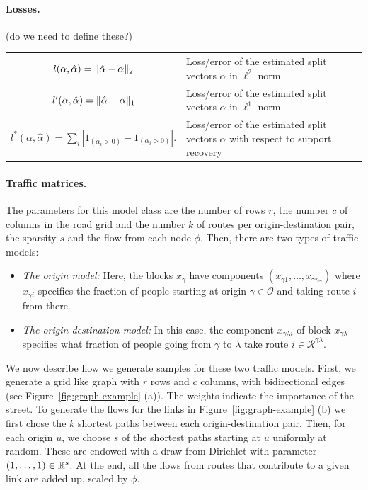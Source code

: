 \documentclass{article} %
\newcommand{\OO}{\mathcal{O}}
\newcommand{\RR}{\mathcal{R}}
\begin{document}
\paragraph{Losses.} (do we need to define these?)
\begin{tabular}{cl}
$l(\alpha, \hat\alpha) = \lVert\hat\alpha - \alpha\rVert_2$ & Loss/error of the estimated split vectors $\alpha$ in $\ell^2$ norm \\
$l'(\alpha, \hat\alpha) = \lVert\hat\alpha - \alpha\rVert_1$ & Loss/error of the estimated split vectors $\alpha$ in $\ell^1$ norm \\
$l^*(\alpha, \hat \alpha) = \sum_{i}|1_{(\hat{\alpha}_i > 0)} - 1_{(\alpha_i > 0)}|.$ & Loss/error of the estimated split vectors $\alpha$ with respect to support recovery
\end{tabular}

\paragraph{Traffic matrices.} The parameters for this model class are the number of rows $r$, the number $c$ of columns in the road grid and the number $k$ of routes per origin-destination pair, the sparsity $s$ and the flow from each node $\phi$. Then, there are two types of traffic models:
\begin{itemize}
  \item \emph{The origin model:} Here, the blocks $x_\gamma$ have
    components $(x_{\gamma1}, \dots, x_{\gamma n_\gamma})$ where
    $x_{\gamma i}$ specifies the fraction of people starting at origin
    $\gamma\in\OO$ and taking route $i$ from there.
  \item \emph{The origin-destination model:} In this case, the component $x_{\gamma\lambda i}$ of block $x_{\gamma\lambda}$ specifies what fraction of people going from $\gamma$ to $\lambda$ take route $i\in \RR^{\gamma\lambda}$.
\end{itemize}
We now describe how we generate samples for these two traffic models.
First, we generate a grid like graph with $r$ rows and $c$ columns, with bidirectional edges (see Figure~\ref{fig:graph-example} (a)). The weights indicate the importance of the street.
To generate the flows for the links in Figure~\ref{fig:graph-example} (b) we first chose the $k$ shortest paths between each origin-destination pair.
Then, for each origin $u$, we choose $s$ of the shortest paths starting at $u$ uniformly at random.
These are endowed with a draw from Dirichlet with parameter $(1, \dots, 1)\in \mathbb{R}^s$.
At the end, all the flows from routes that contribute to a given link are added up, scaled by $\phi$.
\end{document}
